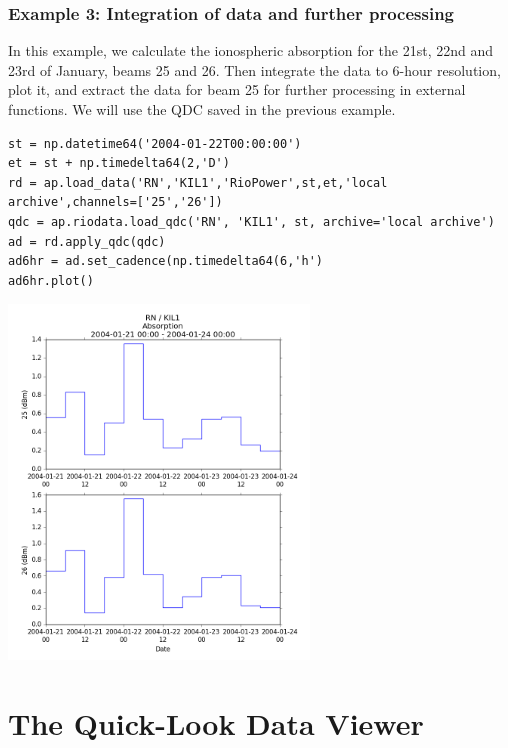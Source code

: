 \documentclass{article}
\begin{document}
\subsubsection{Example 3: Integration of data and further processing}

In this example, we calculate the ionospheric absorption for the 21st, 22nd and 23rd of January, beams 25 and 26. Then integrate the data to 6-hour resolution, plot it, and extract the data for beam 25 for further processing in external functions. We will use the QDC saved in the previous example.

\begin{lstlisting}[style=pythonstyle]
st = np.datetime64('2004-01-22T00:00:00')
et = st + np.timedelta64(2,'D')
rd = ap.load_data('RN','KIL1','RioPower',st,et,'local archive',channels=['25','26'])
qdc = ap.riodata.load_qdc('RN', 'KIL1', st, archive='local archive')
ad = rd.apply_qdc(qdc)
ad6hr = ad.set_cadence(np.timedelta64(6,'h')
ad6hr.plot()
\end{lstlisting}

\includegraphics[width=8cm]{images/figure_6.png}



\section{The Quick-Look Data Viewer}
\end{document}
